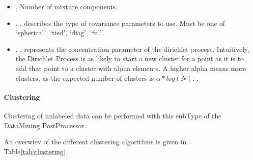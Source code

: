 \begin{itemize}
	\item {},  Number of mixture components. 
	\item {}, , describes the type of covariance parameters to use.
Must be one of ‘spherical’, ‘tied’, ‘diag’, ‘full’. 
	\item {}, ,
represents the concentration parameter of the dirichlet process.
Intuitively, the Dirichlet Process is as likely to start a new cluster
 for a point as it is to add that point to a cluster with alpha
 elements. A higher alpha means more clusters, as the expected
number of clusters is ${\alpha*log(N)}$. .
\end{itemize}

\paragraph{ Clustering }
\label{paragraph:Clustering}

Clustering of unlabeled data can be performed with this subType of
 the DataMining PostProcessor.

An overwiev of the different clustering algorithms is given in
Table\ref{tab:clustering}.

